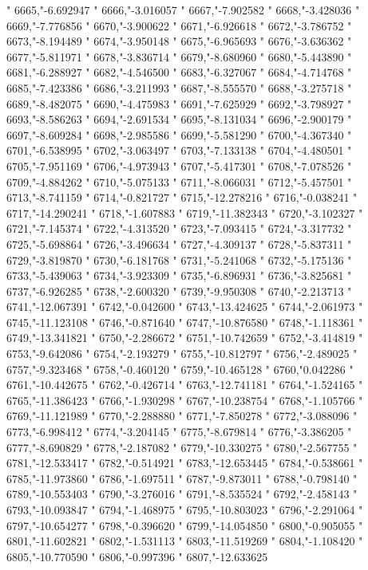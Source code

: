 "
6665,"-6.692947
"
6666,"-3.016057
"
6667,"-7.902582
"
6668,"-3.428036
"
6669,"-7.776856
"
6670,"-3.900622
"
6671,"-6.926618
"
6672,"-3.786752
"
6673,"-8.194489
"
6674,"-3.950148
"
6675,"-6.965693
"
6676,"-3.636362
"
6677,"-5.811971
"
6678,"-3.836714
"
6679,"-8.680960
"
6680,"-5.443890
"
6681,"-6.288927
"
6682,"-4.546500
"
6683,"-6.327067
"
6684,"-4.714768
"
6685,"-7.423386
"
6686,"-3.211993
"
6687,"-8.555570
"
6688,"-3.275718
"
6689,"-8.482075
"
6690,"-4.475983
"
6691,"-7.625929
"
6692,"-3.798927
"
6693,"-8.586263
"
6694,"-2.691534
"
6695,"-8.131034
"
6696,"-2.900179
"
6697,"-8.609284
"
6698,"-2.985586
"
6699,"-5.581290
"
6700,"-4.367340
"
6701,"-6.538995
"
6702,"-3.063497
"
6703,"-7.133138
"
6704,"-4.480501
"
6705,"-7.951169
"
6706,"-4.973943
"
6707,"-5.417301
"
6708,"-7.078526
"
6709,"-4.884262
"
6710,"-5.075133
"
6711,"-8.066031
"
6712,"-5.457501
"
6713,"-8.741159
"
6714,"-0.821727
"
6715,"-12.278216
"
6716,"-0.038241
"
6717,"-14.290241
"
6718,"-1.607883
"
6719,"-11.382343
"
6720,"-3.102327
"
6721,"-7.145374
"
6722,"-4.313520
"
6723,"-7.093415
"
6724,"-3.317732
"
6725,"-5.698864
"
6726,"-3.496634
"
6727,"-4.309137
"
6728,"-5.837311
"
6729,"-3.819870
"
6730,"-6.181768
"
6731,"-5.241068
"
6732,"-5.175136
"
6733,"-5.439063
"
6734,"-3.923309
"
6735,"-6.896931
"
6736,"-3.825681
"
6737,"-6.926285
"
6738,"-2.600320
"
6739,"-9.950308
"
6740,"-2.213713
"
6741,"-12.067391
"
6742,"-0.042600
"
6743,"-13.424625
"
6744,"-2.061973
"
6745,"-11.123108
"
6746,"-0.871640
"
6747,"-10.876580
"
6748,"-1.118361
"
6749,"-13.341821
"
6750,"-2.286672
"
6751,"-10.742659
"
6752,"-3.414819
"
6753,"-9.642086
"
6754,"-2.193279
"
6755,"-10.812797
"
6756,"-2.489025
"
6757,"-9.323468
"
6758,"-0.460120
"
6759,"-10.465128
"
6760,"0.042286
"
6761,"-10.442675
"
6762,"-0.426714
"
6763,"-12.741181
"
6764,"-1.524165
"
6765,"-11.386423
"
6766,"-1.930298
"
6767,"-10.238754
"
6768,"-1.105766
"
6769,"-11.121989
"
6770,"-2.288880
"
6771,"-7.850278
"
6772,"-3.088096
"
6773,"-6.998412
"
6774,"-3.204145
"
6775,"-8.679814
"
6776,"-3.386205
"
6777,"-8.690829
"
6778,"-2.187082
"
6779,"-10.330275
"
6780,"-2.567755
"
6781,"-12.533417
"
6782,"-0.514921
"
6783,"-12.653445
"
6784,"-0.538661
"
6785,"-11.973860
"
6786,"-1.697511
"
6787,"-9.873011
"
6788,"-0.798140
"
6789,"-10.553403
"
6790,"-3.276016
"
6791,"-8.535524
"
6792,"-2.458143
"
6793,"-10.093847
"
6794,"-1.468975
"
6795,"-10.803023
"
6796,"-2.291064
"
6797,"-10.654277
"
6798,"-0.396620
"
6799,"-14.054850
"
6800,"-0.905055
"
6801,"-11.602821
"
6802,"-1.531113
"
6803,"-11.519269
"
6804,"-1.108420
"
6805,"-10.770590
"
6806,"-0.997396
"
6807,"-12.633625
